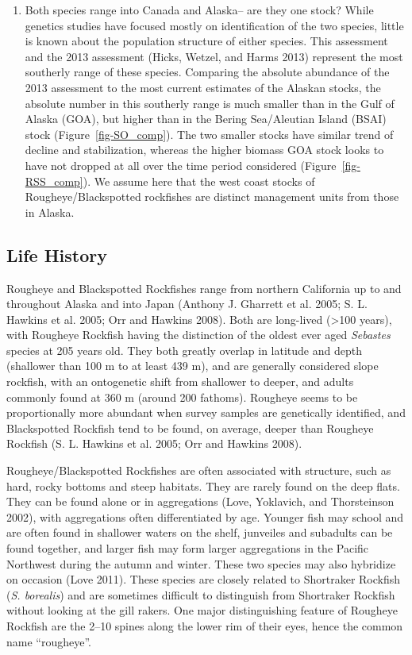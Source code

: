 \documentclass[
]{scrartcl}
\providecommand{\tightlist}{%
  \setlength{\itemsep}{0pt}\setlength{\parskip}{0pt}}\usepackage{longtable,booktabs,array}
\begin{document}
\begin{enumerate}
\def\labelenumi{\arabic{enumi}.}
\setcounter{enumi}{1}
\tightlist
\item
  Both species range into Canada and Alaska-- are they one stock? While
  genetics studies have focused mostly on identification of the two
  species, little is known about the population structure of either
  species. This assessment and the 2013 assessment (Hicks, Wetzel, and
  Harms 2013) represent the most southerly range of these species.
  Comparing the absolute abundance of the 2013 assessment to the most
  current estimates of the Alaskan stocks, the absolute number in this
  southerly range is much smaller than in the Gulf of Alaska (GOA), but
  higher than in the Bering Sea/Aleutian Island (BSAI) stock
  (Figure~\ref{fig-SO_comp}). The two smaller stocks have similar trend
  of decline and stabilization, whereas the higher biomass GOA stock
  looks to have not dropped at all over the time period considered
  (Figure~\ref{fig-RSS_comp}). We assume here that the west coast stocks
  of Rougheye/Blackspotted rockfishes are distinct management units from
  those in Alaska.
\end{enumerate}

\subsection{Life History}\label{life-history}

Rougheye and Blackspotted Rockfishes range from northern California up
to and throughout Alaska and into Japan (Anthony J. Gharrett et al.
2005; S. L. Hawkins et al. 2005; Orr and Hawkins 2008). Both are
long-lived (\textgreater100 years), with Rougheye Rockfish having the
distinction of the oldest ever aged \emph{Sebastes} species at 205 years
old. They both greatly overlap in latitude and depth (shallower than 100
m to at least 439 m), and are generally considered slope rockfish, with
an ontogenetic shift from shallower to deeper, and adults commonly found
at 360 m (around 200 fathoms). Rougheye seems to be proportionally more
abundant when survey samples are genetically identified, and
Blackspotted Rockfish tend to be found, on average, deeper than Rougheye
Rockfish (S. L. Hawkins et al. 2005; Orr and Hawkins 2008).

Rougheye/Blackspotted Rockfishes are often associated with structure,
such as hard, rocky bottoms and steep habitats. They are rarely found on
the deep flats. They can be found alone or in aggregations (Love,
Yoklavich, and Thorsteinson 2002), with aggregations often
differentiated by age. Younger fish may school and are often found in
shallower waters on the shelf, junveiles and subadults can be found
together, and larger fish may form larger aggregations in the Pacific
Northwest during the autumn and winter. These two species may also
hybridize on occasion (Love 2011). These species are closely related to
Shortraker Rockfish (\emph{S. borealis}) and are sometimes difficult to
distinguish from Shortraker Rockfish without looking at the gill rakers.
One major distinguishing feature of Rougheye Rockfish are the 2--10
spines along the lower rim of their eyes, hence the common name
``rougheye''.
\end{document}
